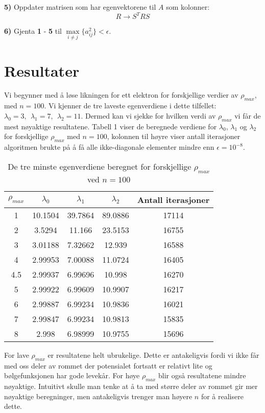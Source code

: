 \documentclass[norsk, 12pt]{article}
\begin{document}
\textbf{5)} Oppdater matrisen som har egenvektorene til $A$ som kolonner: $$R\rightarrow S^TRS$$

\textbf{6)} Gjenta \textbf{1} - \textbf{5} til $\max\limits_{i\neq j}\{a_{ij}^2\}<\epsilon$.

\section{Resultater}
Vi begynner med å løse likningen for ett elektron for forskjellige verdier av $\rho_{max}$, med $n=100$. Vi kjenner
de tre laveste egenverdiene i dette tilfellet: $\lambda_0 = 3,\ \ \lambda_1 = 7,\ \ \lambda_2 = 11$. Dermed kan vi sjekke
for hvilken verdi av $\rho_{max}$ vi får de mest nøyaktige resultatene. Tabell 1 viser de beregnede verdiene for
$\lambda_0$, $\lambda_1$ og $\lambda_2$ for forskjellige $\rho_{max}$ med $n=100$, kolonnen til høyre viser antall
iterasjoner algoritmen brukte på å få alle ikke-diagonale elementer mindre enn $\epsilon = 10^{-8}$.
\begin{table}[h!]
\centering
 \begin{tabular}{|c|c|c|c|c|}\hline
  $\rho_{max}$ & $\lambda_0$ & $\lambda_1$ & $\lambda_2$ & Antall iterasjoner\\ \hline
  1 & 10.1504 & 39.7864 & 89.0886 & 17114\\
  2 & 3.5294 & 11.166 & 23.5153 & 16755\\
  3 & 3.01188 & 7.32662 & 12.939 & 16588\\
  4 & 2.99953 & 7.00088 & 11.0724 & 16405\\
  4.5 & 2.99937 & 6.99696 & 10.998 & 16270\\
  5 & 2.99922 & 6.99609 & 10.9907 & 16217\\
  6 & 2.99887 & 6.99234 & 10.9836 & 16021\\
  7 & 2.99847 & 6.99234 & 10.9813 & 15835\\
  8 & 2.998 & 6.98999 & 10.9755 & 15696\\ \hline
 \end{tabular}
 \caption{De tre minste egenverdiene beregnet for forskjellige $\rho_{max}$ ved $n=100$}
 \end{table}
 
 
For lave $\rho_{max}$ er resultatene helt ubrukelige. Dette er antakeligvis fordi vi ikke får med oss deler av rommet
der potensialet fortsatt er relativt lite og bølgefunksjonen har gode levekår. For høye $\rho_{max}$ blir også resultatene
mindre nøyaktige. Intuitivt skulle man tenke at å ta med større deler av rommet gir mer nøyaktige beregninger, men antakeligvis
trenger man høyere $n$ for å realisere dette.
\end{document}

